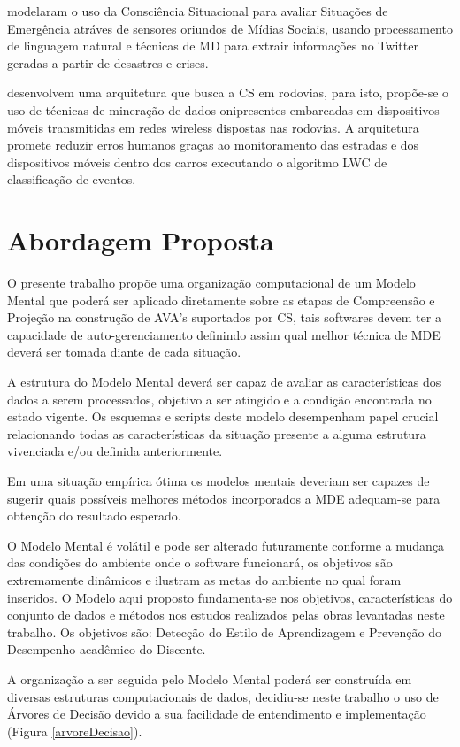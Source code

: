 \documentclass[12pt]{article}
\begin{document}
\cite{Yin_et_al_2012} modelaram o uso da Consciência Situacional para avaliar Situações de Emergência atráves de sensores oriundos de Mídias Sociais, usando processamento de linguagem natural e técnicas de MD para extrair informações no Twitter geradas a partir de desastres e crises.

\cite{Krishnaswamy_et_al_2005} desenvolvem uma arquitetura que busca a CS em rodovias, para isto, propõe-se o uso de técnicas de mineração de dados onipresentes embarcadas em dispositivos móveis transmitidas em redes wireless dispostas nas rodovias. A arquitetura promete reduzir erros humanos graças ao monitoramento das estradas e dos dispositivos móveis dentro dos carros executando o algoritmo LWC de classificação de eventos.

\section{Abordagem Proposta}

O presente trabalho propõe uma organização computacional de um Modelo Mental que poderá ser aplicado diretamente sobre as etapas de Compreensão e Projeção na construção de AVA's suportados por CS, tais softwares devem ter a capacidade de auto-gerenciamento definindo assim qual melhor técnica de MDE deverá ser tomada diante de cada situação.

A estrutura do Modelo Mental deverá ser capaz de avaliar as características dos dados a serem processados, objetivo a ser atingido e a condição encontrada no estado vigente. Os esquemas e scripts deste modelo desempenham papel crucial relacionando todas as características da situação presente a alguma estrutura vivenciada e/ou definida anteriormente.

Em uma situação empírica ótima os modelos mentais deveriam ser capazes de sugerir quais possíveis melhores métodos incorporados a MDE adequam-se para obtenção do resultado esperado. 

O Modelo Mental é volátil e pode ser alterado futuramente conforme a mudança das condições do ambiente onde o software funcionará, os objetivos são extremamente dinâmicos e ilustram as metas do ambiente no qual foram inseridos. O Modelo aqui proposto fundamenta-se nos objetivos, características do conjunto de dados e métodos nos estudos realizados pelas obras levantadas neste trabalho. Os objetivos são: Detecção do Estilo de Aprendizagem e Prevenção do Desempenho acadêmico do Discente.

A organização a ser seguida pelo Modelo Mental poderá ser construída em diversas estruturas computacionais de dados, decidiu-se neste trabalho o uso de Árvores de Decisão devido a sua facilidade de entendimento e implementação (Figura \ref{arvoreDecisao}). 
\end{document}
